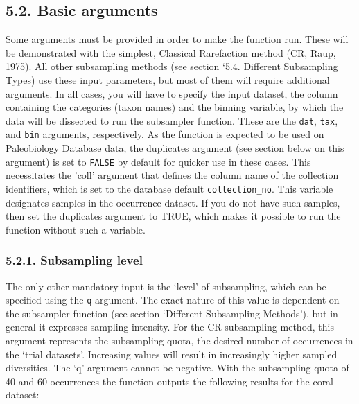 \documentclass[]{article}
\begin{document}
\hypertarget{basic-arguments}{%
\subsection{5.2. Basic arguments}\label{basic-arguments}}

Some arguments must be provided in order to make the function run. These
will be demonstrated with the simplest, Classical Rarefaction method
(CR, Raup, 1975). All other subsampling methods (see section `5.4.
Different Subsampling Types) use these input parameters, but most of
them will require additional arguments. In all cases, you will have to
specify the input dataset, the column containing the categories (taxon
names) and the binning variable, by which the data will be dissected to
run the subsampler function. These are the \texttt{dat}, \texttt{tax},
and \texttt{bin} arguments, respectively. As the function is expected to
be used on Paleobiology Database data, the duplicates argument (see
section below on this argument) is set to \texttt{FALSE} by default for
quicker use in these cases. This necessitates the 'coll' argument that
defines the column name of the collection identifiers, which is set to
the database default \texttt{collection\_no}. This variable designates
samples in the occurrence dataset. If you do not have such samples, then
set the duplicates argument to TRUE, which makes it possible to run the
function without such a variable.

\hypertarget{subsampling-level}{%
\subsubsection{5.2.1. Subsampling level}\label{subsampling-level}}

The only other mandatory input is the `level' of subsampling, which can
be specified using the \texttt{q} argument. The exact nature of this
value is dependent on the subsampler function (see section `Different
Subsampling Methods'), but in general it expresses sampling intensity.
For the CR subsampling method, this argument represents the subsampling
quota, the desired number of occurrences in the `trial datasets'.
Increasing values will result in increasingly higher sampled
diversities. The `q' argument cannot be negative. With the subsampling
quota of 40 and 60 occurrences the function outputs the following
results for the coral dataset:
\end{document}
